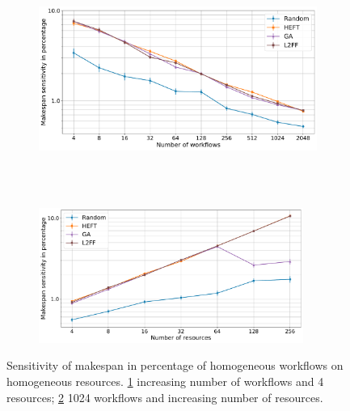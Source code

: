 \begin{figure}[ht!]
    \centering
    \begin{subfigure}[b]{0.75\textwidth}
        \includegraphics[width=.95\textwidth]{figures/campaign/StHomoCampaigns_4DynHomoResourcesSens.pdf}
        \caption{}
        \label{fig:StHomoCampaigns_4DyHomoResourcesSens}
    \end{subfigure}\\
    ~
    \begin{subfigure}[b]{0.75\textwidth}
        \includegraphics[width=0.95\textwidth]{figures/campaign/DynHomoResources_StHomoCampaignsSens.pdf}
        \caption{}
        \label{fig:DyHomoResources_StHomoCampaignsSens}
    \end{subfigure}
    \caption{Sensitivity of makespan in percentage of homogeneous workflows on
        homogeneous resources. \ref{fig:StHomoCampaigns_4DyHomoResourcesSens}
        increasing number of workflows and 4 resources;
        \ref{fig:DyHomoResources_StHomoCampaignsSens} 1024 workflows and
        increasing number of resources.}
    \label{fig:dyn_homog_sens_analysis}
\end{figure}


